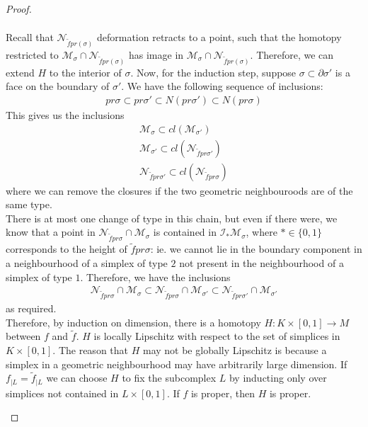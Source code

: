 \documentclass[a4paper,11pt]{article}
\theoremstyle{definition}
\theoremstyle{plain}
\theoremstyle{remark}
\begin{document}
{\begin{proof}
\begin{enumerate}
\begin{align*}
\end{align*} 
Recall that $\mathcal{N}_{\tilde{f}pr(\sigma)}$ deformation retracts to a point, such that the homotopy restricted to $\mathcal{M}_{\sigma}\cap \mathcal{N}_{\tilde{f}pr(\sigma)}$ has image in $\mathcal{M}_{\sigma}\cap \mathcal{N}_{\tilde{f}pr(\sigma)}$. Therefore, we can extend $H$ to the interior of $\sigma$. Now, for the induction step, suppose $\sigma \subset \partial\sigma'$ is a face on the boundary of $\sigma'$. We have the following sequence of inclusions:
\begin{align*}
pr \sigma \subset pr \sigma' \subset N(pr \sigma') \subset N(pr \sigma)
\end{align*}
This gives us the inclusions
\begin{align*}
\mathcal{M}_{\sigma} \subset cl(\mathcal{M}_{\sigma'})\\
 \mathcal{M}_{\sigma'}\subset cl(\mathcal{N}_{\tilde{f}pr \sigma'})\\
\mathcal{N}_{\tilde{f}pr \sigma'}\subset cl(\mathcal{N}_{\tilde{f}pr \sigma})
\end{align*}
where we can remove the closures if the two geometric neighbouroods are of the same type. \\

There is at most one change of type in this chain, but even if there were, we know that a point in $\mathcal{N}_{\tilde{f} pr \sigma} \cap \mathcal{M}_{\sigma}$ is contained in $\mathcal{I}_{\ast}\mathcal{M}_{\sigma} $, where $\ast \in \{0,1\}$ corresponds to the height of $\tilde{f} pr \sigma$: ie. we cannot lie in the boundary component in a neighbourhood of a simplex of type $2$ not present in the neighbourhood of a simplex of type $1$. Therefore, we have the inclusions
\begin{align*}
\mathcal{N}_{\tilde{f} pr \sigma} \cap \mathcal{M}_{\sigma} \subset \mathcal{N}_{\tilde{f} pr \sigma}\cap \mathcal{M}_{\sigma'} \subset \mathcal{N}_{\tilde{f} pr \sigma'} \cap \mathcal{M}_{\sigma'}
\end{align*}
as required.\\

Therefore, by induction on dimension, there is a homotopy $H: K\times [0,1] \rightarrow M$ between $f$ and $\tilde{f}$. $H$ is locally Lipschitz with respect to the set of simplices in $K \times [0,1]$. The reason that $H$ may not be globally Lipschitz is because a simplex in a geometric neighbourhood may have arbitrarily large dimension. If $f_{|L} = \tilde{f}_{|L}$ we can choose $H$ to fix the subcomplex $L$ by inducting only over simplices not contained in $L \times [0,1]$. If $f$ is proper, then $H$ is proper.\\


\end{enumerate}
\end{proof}}
\end{document}
